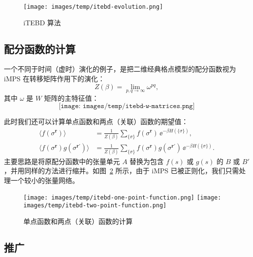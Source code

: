 \begin{figure}[htb]
  \centering
  \texttt{[image: images/temp/itebd-evolution.png]}
  \caption{iTEBD 算法}
  \label{fig:itebd-evolution}
\end{figure}

\subsection{配分函数的计算}
\label{subsec:partition-function}

一个不同于时间（虚时）演化的例子，是把二维经典格点模型的配分函数视为 iMPS 在转移矩阵作用下的演化：
\begin{equation}
  Z(\beta) = \lim_{p,q\to\infty} \omega^{pq},
\end{equation}
其中 $\omega$ 是 $W$ 矩阵的主特征值：
\begin{equation}
  \texttt{[image: images/temp/itebd-w-matrices.png]}
\end{equation}

此时我们还可以计算单点函数和两点（关联）函数的期望值：
\begin{equation}
  \begin{aligned}
    \langle f(\sigma^{\bm{r}}) \rangle
      &= \frac{1}{Z(\beta)} \sum_{\{\sigma\}} f(\sigma^{\bm{r}}) \, \ee^{-\beta H(\{\sigma\})}, \\
    \langle f(\sigma^{\bm{r}}) g(\sigma^{\bm{r}'}) \rangle
      &= \frac{1}{Z(\beta)} \sum_{\{\sigma\}} f(\sigma^{\bm{r}}) g(\sigma^{\bm{r}'}) \, \ee^{-\beta H(\{\sigma\})}.
  \end{aligned}
\end{equation}
主要思路是将原配分函数中的张量单元 $A$ 替换为包含 $f(s)$ 或 $g(s)$ 的 $B$ 或 $B'$，并用同样的方法进行缩并。如图~\ref{fig:expectation-value} 所示，由于 iMPS 已被正则化，我们只需处理一个较小的张量网络。

\begin{figure}[htb]
  \centering
  \texttt{[image: images/temp/itebd-one-point-function.png]} \quad
  \texttt{[image: images/temp/itebd-two-point-function.png]}
  \caption{单点函数和两点（关联）函数的计算}
  \label{fig:expectation-value}
\end{figure}

\subsection{推广}
\label{subsec:mps-generalization}

